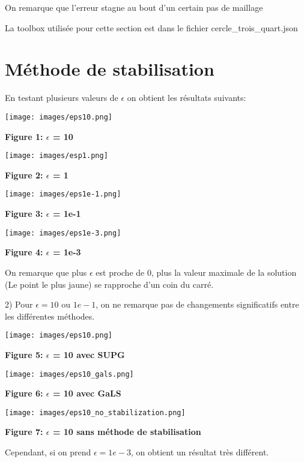 \documentclass{article}
\begin{document}
On remarque que l'erreur stagne au bout d'un certain pas de maillage

La toolbox utilisée pour cette section est dans le fichier cercle\_trois\_quart.json

\section{Méthode de stabilisation}

En testant plusieurs valeurs de $\epsilon$ on obtient les résultats suivants:

\texttt{[image: images/eps10.png]}
\begin{center}
    \textbf{Figure 1: $\epsilon$ = 10}
\end{center}
\texttt{[image: images/esp1.png]}
\begin{center}
    \textbf{Figure 2: $\epsilon$ = 1}
\end{center}
\texttt{[image: images/eps1e-1.png]}
\begin{center}
    \textbf{Figure 3: $\epsilon$ = 1e-1}
\end{center}
\texttt{[image: images/eps1e-3.png]}
\begin{center}
    \textbf{Figure 4: $\epsilon$ = 1e-3}
\end{center}

On remarque que plus $\epsilon$ est proche de 0, plus la valeur maximale de la solution (Le point le plus jaune) se rapproche d'un coin du carré.

2) Pour $\epsilon = 10$ ou $1e-1$, on ne remarque pas de changements significatifs entre les différentes méthodes.

\texttt{[image: images/eps10.png]}
\begin{center}
    \textbf{Figure 5: $\epsilon$ = 10 avec SUPG}
\end{center}
\texttt{[image: images/eps10\_gals.png]}
\begin{center}
    \textbf{Figure 6: $\epsilon$ = 10 avec GaLS}
\end{center}
\texttt{[image: images/eps10\_no\_stabilization.png]}
\begin{center}
    \textbf{Figure 7: $\epsilon$ = 10 sans méthode de stabilisation}
\end{center}

Cependant, si on prend $\epsilon = 1e-3$, on obtient un résultat très différent.
\end{document}
